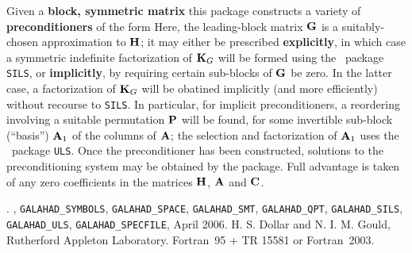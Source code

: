 \documentclass{galahad}
\newcommand{\packagename}{SBLS}
\newcommand{\fullpackagename}{\libraryname\_\packagename}
\begin{document}
\galheader


\galsummary
Given a {\bf block, symmetric matrix}
this package constructs a variety of {\bf preconditioners} of the form
Here, the leading-block matrix ${\mathbf{G}}$ is a suitably-chosen 
approximation to ${\mathbf{H}}$; it may either be prescribed {\bf explicitly}, in 
which case a symmetric indefinite factorization of ${\mathbf{K}}_{G}$
will be formed using the \galahad\ package {\tt SILS}, 
or {\bf implicitly}, by requiring certain sub-blocks of ${\mathbf{G}}$ 
be zero. In the latter case, a factorization of ${\mathbf{K}}_{G}$ will be
obatined implicitly (and more efficiently) without recourse to {\tt SILS}. 
In particular, for implicit preconditioners, a reordering 
involving a suitable permutation ${\mathbf{P}}$ will be found, for some
invertible sub-block (``basis'') ${\mathbf{A}}_1$ of the columns of ${\mathbf{A}}$;
the selection and factorization of ${\mathbf{A}}_1$ uses
the \galahad\ package {\tt ULS}.
Once the preconditioner has been constructed, 
solutions to the preconditioning system
may be obtained by the package.
Full advantage is taken of any zero coefficients in the matrices ${\mathbf{H}}$,
${\mathbf{A}}$ and ${\mathbf{C}}$.


\galattributes
\galversions{\tt  \fullpackagename\_single, \fullpackagename\_double}.
,
{\tt GALAHAD\_SY\-M\-BOLS}, 
{\tt GALAHAD\-\_SPACE}, 
{\tt GALAHAD\_SMT},
{\tt GALAHAD\_QPT},
{\tt GALAHAD\_SILS},
{\tt GALAHAD\_ULS}, 
{\tt GALAHAD\_SPECFILE},
\galdate April 2006.
\galorigin \linebreak H. S. Dollar and N. I. M. Gould,
Rutherford Appleton Laboratory.
\gallanguage Fortran~95 + TR 15581 or Fortran~2003. 

\end{document}
